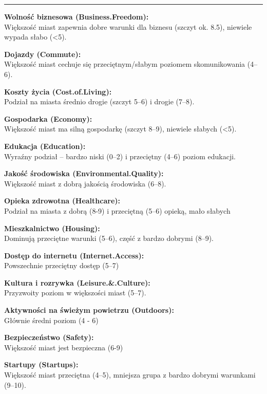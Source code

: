 \documentclass[
  12pt,
]{article}
\begin{document}
\begin{center}\rule{0.5\linewidth}{0.5pt}\end{center}

\textbf{Wolność biznesowa (Business.Freedom):}\\
Większość miast zapewnia dobre warunki dla biznesu (szczyt ok. 8.5),
niewiele wypada słabo (\textless5).

\textbf{Dojazdy (Commute):}\\
Większość miast cechuje się przeciętnym/słabym poziomem skomunikowania
(4--6).

\textbf{Koszty życia (Cost.of.Living):}\\
Podział na miasta średnio drogie (szczyt 5--6) i drogie (7--8).

\textbf{Gospodarka (Economy):}\\
Większość miast ma silną gospodarkę (szczyt 8--9), niewiele słabych
(\textless5).

\textbf{Edukacja (Education):}\\
Wyraźny podział -- bardzo niski (0--2) i przeciętny (4--6) poziom
edukacji.

\textbf{Jakość środowiska (Environmental.Quality):}\\
Większość miast z dobrą jakością środowiska (6--8).

\textbf{Opieka zdrowotna (Healthcare):}\\
Podział na miasta z dobrą (8-9) i przeciętną (5--6) opieką, mało słabych

\textbf{Mieszkalnictwo (Housing):}\\
Dominują przeciętne warunki (5--6), część z bardzo dobrymi (8--9).

\textbf{Dostęp do internetu (Internet.Access):}\\
Powszechnie przeciętny dostęp (5--7)

\textbf{Kultura i rozrywka (Leisure.\&.Culture):}\\
Przyzwoity poziom w większości miast (5--7).

\textbf{Aktywności na świeżym powietrzu (Outdoors):}\\
Głównie średni poziom (4 - 6)

\textbf{Bezpieczeństwo (Safety):}\\
Większość miast jest bezpieczna (6-9)

\textbf{Startupy (Startups):}\\
Większość miast przeciętna (4--5), mniejsza grupa z bardzo dobrymi
warunkami (9--10).
\end{document}
